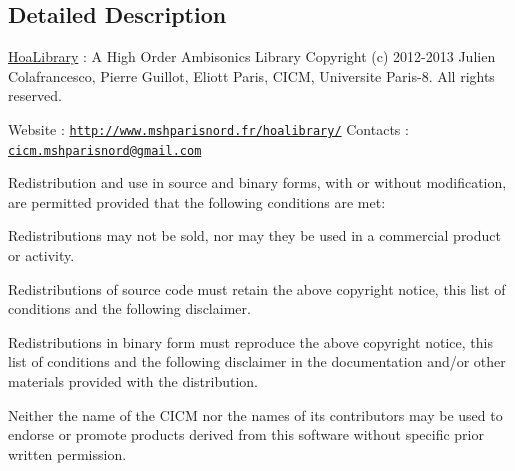 \subsection{Detailed Description}
\hyperlink{interface_hoa_library}{Hoa\-Library} \-: A High Order Ambisonics Library Copyright (c) 2012-\/2013 Julien Colafrancesco, Pierre Guillot, Eliott Paris, C\-I\-C\-M, Universite Paris-\/8. All rights reserved.

Website \-: \href{http://www.mshparisnord.fr/hoalibrary/}{\tt http\-://www.\-mshparisnord.\-fr/hoalibrary/} Contacts \-: \href{mailto:cicm.mshparisnord@gmail.com}{\tt cicm.\-mshparisnord@gmail.\-com}

Redistribution and use in source and binary forms, with or without modification, are permitted provided that the following conditions are met\-:


\begin{DoxyItemize}
\item Redistributions may not be sold, nor may they be used in a commercial product or activity.
\item Redistributions of source code must retain the above copyright notice, this list of conditions and the following disclaimer.
\item Redistributions in binary form must reproduce the above copyright notice, this list of conditions and the following disclaimer in the documentation and/or other materials provided with the distribution.
\item Neither the name of the C\-I\-C\-M nor the names of its contributors may be used to endorse or promote products derived from this software without specific prior written permission.
\end{DoxyItemize}

